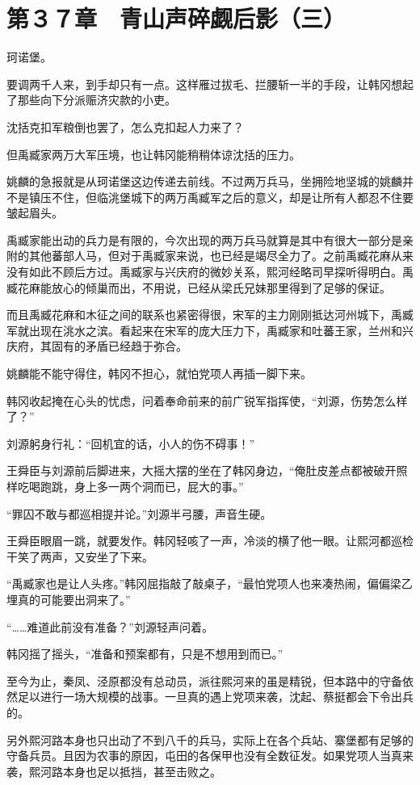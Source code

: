 \section{第３７章　青山声碎觑后影（三）}

珂诺堡。

要调两千人来，到手却只有一点。这样雁过拔毛、拦腰斩一半的手段，让韩冈想起了那些向下分派赈济灾款的小吏。

沈括克扣军粮倒也罢了，怎么克扣起人力来了？

但禹臧家两万大军压境，也让韩冈能稍稍体谅沈括的压力。

姚麟的急报就是从珂诺堡这边传递去前线。不过两万兵马，坐拥险地坚城的姚麟并不是镇压不住，但临洮堡城下的两万禹臧军之后的意义，却是让所有人都忍不住要皱起眉头。

禹臧家能出动的兵力是有限的，今次出现的两万兵马就算是其中有很大一部分是亲附的其他蕃部人马，但对于禹臧家来说，也已经是竭尽全力了。之前禹臧花麻从来没有如此不顾后方过。禹臧家与兴庆府的微妙关系，熙河经略司早探听得明白。禹臧花麻能放心的倾巢而出，不用说，已经从梁氏兄妹那里得到了足够的保证。

而且禹臧花麻和木征之间的联系也紧密得很，宋军的主力刚刚抵达河州城下，禹臧军就出现在洮水之滨。看起来在宋军的庞大压力下，禹臧家和吐蕃王家，兰州和兴庆府，其固有的矛盾已经趋于弥合。

姚麟能不能守得住，韩冈不担心，就怕党项人再插一脚下来。

韩冈收起掩在心头的忧虑，问着奉命前来的前广锐军指挥使，“刘源，伤势怎么样了？”

刘源躬身行礼：“回机宜的话，小人的伤不碍事！”

王舜臣与刘源前后脚进来，大摇大摆的坐在了韩冈身边，“俺肚皮差点都被破开照样吃喝跑跳，身上多一两个洞而已，屁大的事。”

“罪囚不敢与都巡相提并论。”刘源半弓腰，声音生硬。

王舜臣眼眉一跳，就要发作。韩冈轻咳了一声，冷淡的横了他一眼。让熙河都巡检干笑了两声，又安坐了下来。

“禹臧家也是让人头疼。”韩冈屈指敲了敲桌子，“最怕党项人也来凑热闹，偏偏梁乙埋真的可能要出洞来了。”

“……难道此前没有准备？”刘源轻声问着。

韩冈摇了摇头，“准备和预案都有，只是不想用到而已。”

至今为止，秦凤、泾原都没有总动员，派往熙河来的虽是精锐，但本路中的守备依然足以进行一场大规模的战事。一旦真的遇上党项来袭，沈起、蔡挺都会下令出兵的。

另外熙河路本身也只出动了不到八千的兵马，实际上在各个兵站、寨堡都有足够的守备兵员。且因为农事的原因，屯田的各保甲也没有全数征发。如果党项人当真来袭，熙河路本身也足以抵挡，甚至击败之。

